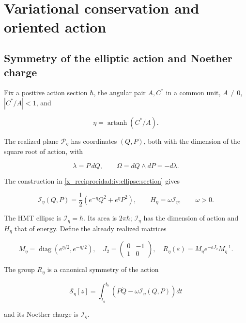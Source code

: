 \chapter{Variational conservation and oriented action}
\label{x_reciprocidad:nuclear:7}
\section{Symmetry of the elliptic action and Noether charge}

Fix a positive action section \(\hbar\), the angular pair \(A,C^*\) in a common unit, \(A\ne0\), \(|C^*/A|<1\), and

\[
\eta=\operatorname{artanh}(C^*/A).
\]

The realized plane \(\mathcal P_\eta\) has coordinates \((Q,P)\), both with the dimension of the square root of action, with

\[
\lambda=P\,dQ,\qquad \Omega=dQ\wedge dP=-d\lambda.
\]

The construction in \cref{x_reciprocidad:iv:ellipse:section} gives

\begin{equation}
\mathcal I_\eta(Q,P)=\frac12(e^{-\eta}Q^2+e^\eta P^2),
\qquad H_\eta=\omega\mathcal I_\eta,\qquad \omega>0.
\label{x_reciprocidad:nuc07:eq:1}
\end{equation}

The HMT ellipse is \(\mathcal I_\eta=\hbar\). Its area is \(2\pi\hbar\); \(\mathcal I_\eta\) has the dimension of action and \(H_\eta\) that of energy. Define the already realized matrices

\begin{equation}
M_\eta=\operatorname{diag}(e^{\eta/2},e^{-\eta/2}),\quad
J_2=\begin{pmatrix}0&-1\\1&0\end{pmatrix},\quad
R_\eta(\varepsilon)=M_\eta e^{-\varepsilon J_2}M_\eta^{-1}.
\label{x_reciprocidad:nuc07:eq:2}
\end{equation}

\begin{proposition}
The group \(R_\eta\) is a canonical symmetry of the action

\begin{equation}
\mathscr S_\eta[z]=\int_{t_a}^{t_b}
\left(P\dot Q-\omega\mathcal I_\eta(Q,P)\right)dt
\label{x_reciprocidad:nuc07:eq:3}
\end{equation}

and its Noether charge is \(\mathcal I_\eta\).
\end{proposition}

